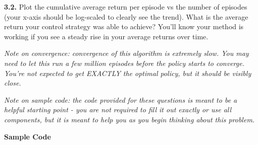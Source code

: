 \documentclass[
  letterpaper,
  DIV=11,
  numbers=noendperiod]{scrartcl}
\begin{document}
\textbf{3.2.} Plot the cumulative average return per episode vs the
number of episodes (your x-axis should be log-scaled to clearly see the
trend). What is the average return your control strategy was able to
achieve? You'll know your method is working if you see a steady rise in
your average returns over time.

\emph{Note on convergence: convergence of this algorithm is extremely
slow. You may need to let this run a few million episodes before the
policy starts to converge. You're not expected to get EXACTLY the
optimal policy, but it should be visibly close.}

\emph{Note on sample code: the code provided for these questions is
meant to be a helpful starting point - you are not required to fill it
out exactly or use all components, but it is meant to help you as you
begin thinking about this problem.}

\textbf{Sample Code}
\end{document}
